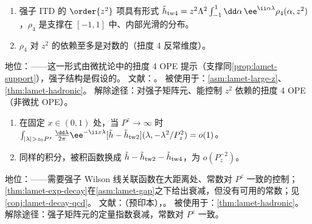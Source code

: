 \begin{assumption}\label{asm:lamet-twist4}
\begin{enumerate}[label=(TW\arabic*),leftmargin=3.4em,itemsep=1pt,topsep=2pt]
\item 强子 ITD 的 $\order{z^2}$ 项具有形式 $\tilde h_{\rm tw4}=z^2\Lambda^2\int_{-1}^1\dd\alpha\,\ee^{\ii\alpha\lambda}\rho_4(\alpha,z^2)$，$\rho_4$ 是支撑在 $[-1,1]$ 中、内部光滑的分布。
\item $\rho_4$ 对 $z^2$ 的依赖至多是对数的（扭度 4 反常维度）。
\end{enumerate}
地位：\tagC——这一形式由微扰论中的扭度 4 OPE 提示（支撑同\cref{prop:lamet-support}），强子结构是假设的。
文献：\cite{Braun:2018brg,Radyushkin2017,JiEtAl2021}。
被使用于：\cref{asm:lamet-large-z}、\cref{thm:lamet-hadronic}。
解除途径：对强子矩阵元、能控制 $z^2$ 依赖的扭度 4 OPE（非微扰 OPE）。
\end{assumption}

\begin{assumption}\label{asm:lamet-large-z}
\begin{enumerate}[label=(LZ\arabic*),leftmargin=3.4em,itemsep=1pt,topsep=2pt]
\item 在固定 $x\in(0,1)$ 处，当 $P^z\to\infty$ 时 $\int_{|\lambda|>z_0P^z}\frac{\dd\lambda}{2\pi}\ee^{-\ii x\lambda}[\tilde h-\tilde h_{\rm tw2}](\lambda,-\lambda^2/P_z^2)=o(1)$。
\item 同样的积分，被积函数换成 $\tilde h-\tilde h_{\rm tw2}-\tilde h_{\rm tw4}$，为 $o(P_z^{-2})$。
\end{enumerate}
地位：\tagC——需要强子 Wilson 线关联函数在大距离处、常数对 $P^z$ 一致的控制；\cref{thm:lamet-exp-decay}在\cref{asm:lamet-gap}之下给出衰减，但没有可用的常数；见\cref{conj:lamet-decay-qcd}。
文献：\cite{Ji:2026vir}（预印本），\cite{JiEtAl2021,Gao:2021dbh}。
被使用于：\cref{thm:lamet-hadronic}。
解除途径：强子矩阵元的定量指数衰减，常数对 $P^z$ 一致。
\end{assumption}

